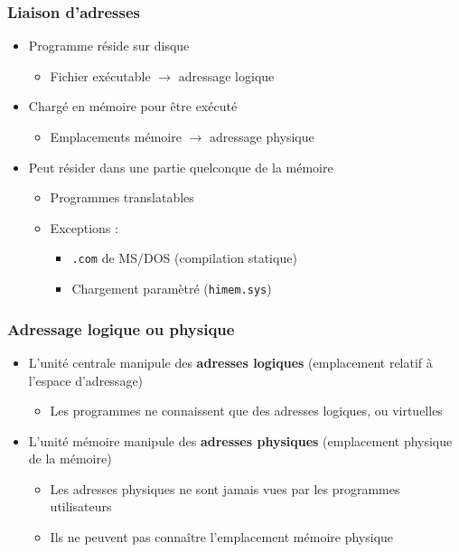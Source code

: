 \begin{frame}
\frametitle{Liaison d’adresses}
\begin{itemize}
\item Programme réside sur disque 
\begin{itemize}
\item Fichier exécutable $\rightarrow$ adressage logique
\end{itemize}
\item Chargé en mémoire pour être exécuté
\begin{itemize}
\item Emplacements mémoire $\rightarrow$ adressage physique
\end{itemize}
\item Peut résider dans une partie quelconque de la mémoire
\begin{itemize}
\item Programmes translatables
\item Exceptions : 
\begin{itemize}
\item \texttt{.com} de MS/DOS (compilation statique)
\item Chargement paramètré (\texttt{himem.sys})
\end{itemize}
\end{itemize}
\end{itemize}
\end{frame}

\begin{frame}
\frametitle{Adressage logique ou physique}
\begin{itemize}
\item <1>L’unité centrale manipule des \textbf{adresses logiques} (emplacement relatif à l'espace d'adressage)
\begin{itemize}
\item Les programmes ne connaissent que des adresses logiques, ou virtuelles
\end{itemize}
\item <2>L’unité mémoire manipule des \textbf{adresses physiques} (emplacement physique de la mémoire)
\begin{itemize}
\item Les adresses physiques ne sont jamais vues par les programmes utilisateurs
\item Ils ne peuvent pas connaître l'emplacement mémoire physique 
\end{itemize}
\end{itemize}
\end{frame}


